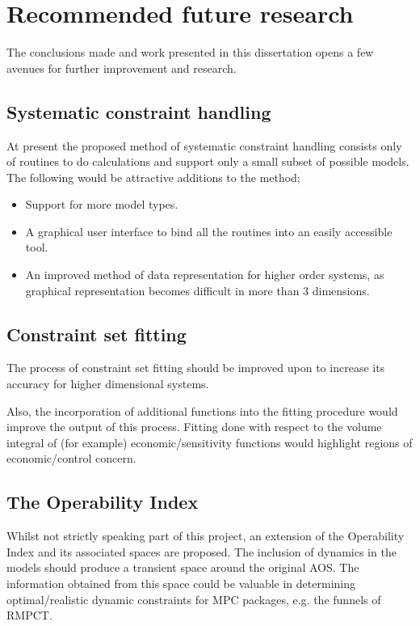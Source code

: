 \section{Recommended future research}
The conclusions made and work presented in this dissertation opens a few avenues for further improvement and research.
\subsection{Systematic constraint handling}
At present the proposed method of systematic constraint handling consists only of routines to do calculations and support only a small subset of possible models.
The following would be attractive additions to the method;
\begin{itemize}
  \item Support for more model types.
  \item A graphical user interface to bind all the routines into an easily accessible tool.
  \item An improved method of data representation for higher order systems, as graphical representation becomes difficult in more than 3 dimensions. 
\end{itemize}
\subsection{Constraint set fitting}
The process of constraint set fitting should be improved upon to increase its accuracy for higher dimensional systems.

Also, the incorporation of additional functions into the fitting procedure would improve the output of this process.
Fitting done with respect to the volume integral of (for example) economic/sensitivity functions would highlight regions of economic/control concern.

\subsection{The Operability Index}
Whilst not strictly speaking part of this project, an extension of the Operability Index and its associated spaces are proposed.
The inclusion of dynamics in the models should produce a transient space around the original AOS.
The information obtained from this space could be valuable in determining optimal/realistic dynamic constraints for MPC packages, e.g. the funnels of RMPCT.

